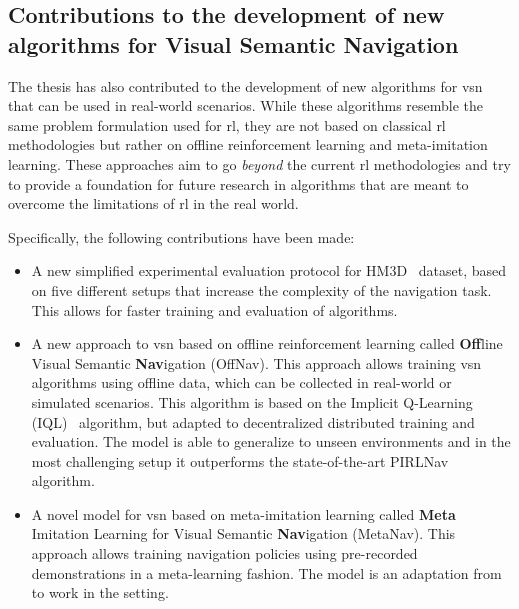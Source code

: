\subsection{Contributions to the development of new algorithms for Visual Semantic Navigation}\label{subsec:contributions-to-new-algorithms-for-visual-semantic-navigation}

The thesis has also contributed to the development of new algorithms for \acrshort{vsn} that can be used in real-world scenarios.
While these algorithms resemble the same problem formulation used for \acrshort{rl}, they are not based on classical \acrshort{rl} methodologies but rather on offline reinforcement learning and meta-imitation learning.
These approaches aim to go \textit{beyond} the current \acrshort{rl} methodologies and try to provide a foundation for future research in algorithms that are meant to overcome the limitations of \acrshort{rl} in the real world.

Specifically, the following contributions have been made:

\begin{itemize}
    \item A new simplified experimental evaluation protocol for HM3D~\cite{ramakrishnan2021} dataset, based on five different setups that increase the complexity of the navigation task.
    This allows for faster training and evaluation of algorithms.
    \item A new approach to \acrshort{vsn} based on offline reinforcement learning called \textbf{Off}line Visual Semantic \textbf{Nav}igation (OffNav).
    This approach allows training \acrshort{vsn} algorithms using offline data, which can be collected in real-world or simulated scenarios.
    This algorithm is based on the Implicit Q-Learning (IQL)~\cite{kostrikov2022offline} algorithm, but adapted to decentralized distributed training and evaluation.
    The model is able to generalize to unseen environments and in the most challenging setup it outperforms the state-of-the-art PIRLNav~\cite{ramrakhya2023} algorithm.
    \item A novel model for \acrshort{vsn} based on meta-imitation learning called \textbf{Meta} Imitation Learning for Visual Semantic \textbf{Nav}igation (MetaNav).
    This approach allows training navigation policies using pre-recorded demonstrations in a meta-learning fashion.
    The model is an adaptation from~\cite{finnOneShotVisualImitation2017} to work in the \objnav setting.
\end{itemize}

